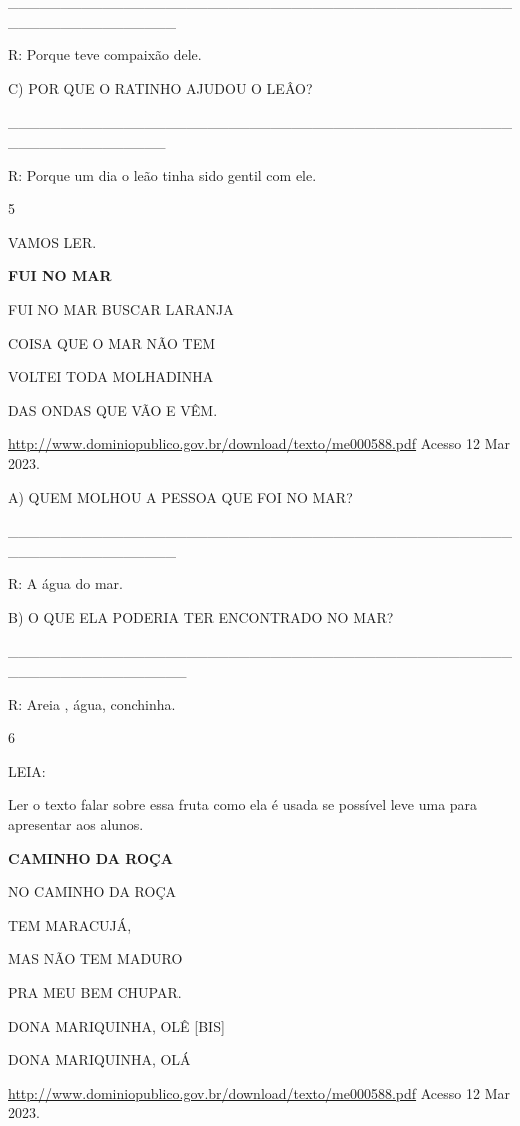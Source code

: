 {{{{{{\_\_\_\_\_\_\_\_\_\_\_\_\_\_\_\_\_\_\_\_\_\_\_\_\_\_\_\_\_\_\_\_\_\_\_\_\_\_\_\_\_\_\_\_\_\_\_\_\_\_\_\_\_\_\_\_\_\_\_\_\_\_\_\_

R: Porque teve compaixão dele.

C) POR QUE O RATINHO AJUDOU O LEÂO?

\_\_\_\_\_\_\_\_\_\_\_\_\_\_\_\_\_\_\_\_\_\_\_\_\_\_\_\_\_\_\_\_\_\_\_\_\_\_\_\_\_\_\_\_\_\_\_\_\_\_\_\_\_\_\_\_\_\_\_\_\_\_\_

R: Porque um dia o leão tinha sido gentil com ele.

\protect\hypertarget{_heading=h.cx2waide4olu}{}{}

\num{5}

VAMOS LER.

\textbf{FUI NO MAR}

FUI NO MAR BUSCAR LARANJA

COISA QUE O MAR NÃO TEM

VOLTEI TODA MOLHADINHA

DAS ONDAS QUE VÃO E VÊM.

\url{http://www.dominiopublico.gov.br/download/texto/me000588.pdf}
Acesso 12 Mar 2023.

A) QUEM MOLHOU A PESSOA QUE FOI NO MAR?

\_\_\_\_\_\_\_\_\_\_\_\_\_\_\_\_\_\_\_\_\_\_\_\_\_\_\_\_\_\_\_\_\_\_\_\_\_\_\_\_\_\_\_\_\_\_\_\_\_\_\_\_\_\_\_\_\_\_\_\_\_\_\_\_

R: A água do mar.

B) O QUE ELA PODERIA TER ENCONTRADO NO MAR?

\_\_\_\_\_\_\_\_\_\_\_\_\_\_\_\_\_\_\_\_\_\_\_\_\_\_\_\_\_\_\_\_\_\_\_\_\_\_\_\_\_\_\_\_\_\_\_\_\_\_\_\_\_\_\_\_\_\_\_\_\_\_\_\_\_

R: Areia , água, conchinha.

\num{6}

LEIA:

Ler o texto falar sobre essa fruta como ela é usada se possível leve uma
para apresentar aos alunos.

\textbf{CAMINHO DA ROÇA}

NO CAMINHO DA ROÇA

TEM MARACUJÁ,

MAS NÃO TEM MADURO

PRA MEU BEM CHUPAR.

DONA MARIQUINHA, OLÊ {[}BIS{]}

DONA MARIQUINHA, OLÁ

\url{http://www.dominiopublico.gov.br/download/texto/me000588.pdf}
Acesso 12 Mar 2023.

}}}}}}
